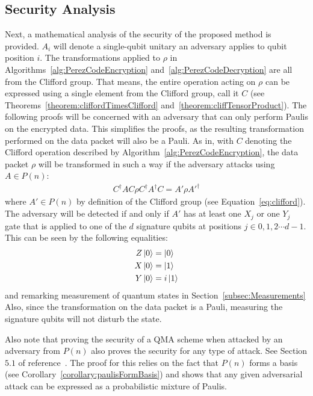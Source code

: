 \subsection{Security Analysis}
Next, a mathematical analysis of the security of the proposed method is provided. $A_i$ will denote a single-qubit unitary an adversary applies to qubit position $i$. The transformations applied to $\rho$ in Algorithms~\ref{alg:PerezCodeEncryption} and~\ref{alg:PerezCodeDecryption} are all from the Clifford group. That means, the entire operation acting on $\rho$ can be expressed using a single element from the Clifford group, call it $C$ (see Theorems~\ref{theorem:cliffordTimesClifford} and~\ref{theorem:cliffTensorProduct}). The following proofs will be concerned with an adversary that can only perform Paulis on the encrypted data. This simplifies the proofs, as the resulting transformation performed on the data packet will also be a Pauli. As in, with $C$ denoting the Clifford operation described by Algorithm~\ref{alg:PerezCodeEncryption}, the data packet $\rho$ will be transformed in such a way if the adversary attacks using $A \in P(n)$: 
\begin{align}
C^{\dagger}AC \rho C^{\dagger}A^{\dagger}C = A' \rho A'^{\dagger}
\end{align}
where $A' \in P(n)$ by definition of the Clifford group (see Equation~\eqref{eq:clifford}). The adversary will be detected if and only if $A'$ has at least one $X_j$ or one $Y_j$ gate that is applied to one of the $d$ signature qubits at positions $j \in {0, 1, 2 \cdots d-1}$. This can be seen by the following equalities:
\begin{align}
Z\ket{0} &= \ket{0}\\
X\ket{0} &= \ket{1}\\
Y\ket{0} &= i\ket{1}
\end{align}
and remarking measurement of quantum states in Section~\ref{subsec:Measurements} Also, since the transformation on the data packet is a Pauli, measuring the signature qubits will not disturb the state.

Also note that proving the security of a QMA scheme when attacked by an adversary from $P(n)$ also proves the security for any type of attack. See Section $5.1$ of reference~\cite{broadbent2013quantum}. The proof for this relies on the fact that $P(n)$ forms a basis (see Corollary~\ref{corollary:paulisFormBasis}) and shows that any given adversarial attack can be expressed as a probabilistic mixture of Paulis.

